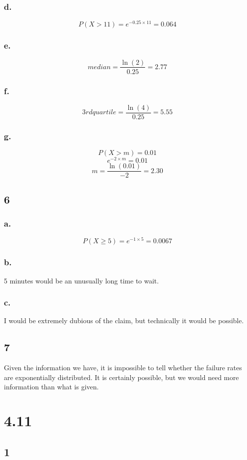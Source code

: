\documentclass[11pt]{article}
\begin{document}
\subsubsection{d.}
\[ P(X > 11) = e^{-0.25 \times 11} = 0.064 \]
\subsubsection{e.}
\[ median = \frac{\ln(2)}{0.25} = 2.77 \]
\subsubsection{f.}
\[ 3rd quartile = \frac{\ln(4)}{0.25} = 5.55 \]
\subsubsection{g.}
\[ P(X > m) = 0.01 \]
\[ e^{-2 \times m} = 0.01 \]
\[ m = \frac{\ln(0.01)}{-2} = 2.30 \]

\subsection{6}
\subsubsection{a.}
\[ P(X \ge 5) = e^{-1 \times 5} = 0.0067 \]
\subsubsection{b.}
5 minutes would be an unusually long time to wait. 
\subsubsection{c.}
I would be extremely dubious of the claim, but technically it would be possible.
\subsection{7}
Given the information we have, it is impossible to tell whether the failure
rates are exponentially distributed. It is certainly possible, but we would need
more information than what is given.


\section{4.11}
\subsection{1}
\end{document}
